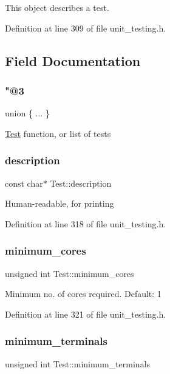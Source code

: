This object describes a test. 

Definition at line 309 of file unit\+\_\+testing.\+h.



\subsection{Field Documentation}
\mbox{\label{structTest_a6dd50dae1a4469e7723e85331dbf9ba0}} 
\subsubsection{\texorpdfstring{"@3}{@3}}
{\footnotesize\ttfamily union \{ ... \} }

\hyperlink{structTest}{Test} function, or list of tests \mbox{\label{structTest_a294ca3f1114240c908f66216afcad783}} 
\subsubsection{\texorpdfstring{description}{description}}
{\footnotesize\ttfamily const char$\ast$ Test\+::description}

Human-\/readable, for printing 

Definition at line 318 of file unit\+\_\+testing.\+h.

\mbox{\label{structTest_ac203918837b4c6718a020246e189a95a}} 
\subsubsection{\texorpdfstring{minimum\+\_\+cores}{minimum\_cores}}
{\footnotesize\ttfamily unsigned int Test\+::minimum\+\_\+cores}

Minimum no. of cores required. Default\+: 1 

Definition at line 321 of file unit\+\_\+testing.\+h.

\mbox{\label{structTest_a2741188633c51b8e3cb545fa3971bf60}} 
\subsubsection{\texorpdfstring{minimum\+\_\+terminals}{minimum\_terminals}}
{\footnotesize\ttfamily unsigned int Test\+::minimum\+\_\+terminals}


